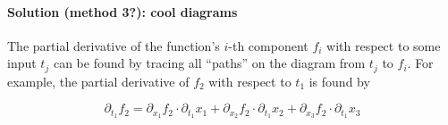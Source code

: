 \documentclass[11pt]{article}
\begin{document}
\paragraph{Solution (method 3?): cool diagrams}

\begin{center}
    \begin{tikzpicture}
        
    \end{tikzpicture}
\end{center}

The partial derivative of the function's \(i\)-th component \(f_i\) with respect to some input \(t_j\) can be found by tracing all ``paths'' on the diagram from \(t_j\) to \(f_i\). For example, the partial derivative of \(f_2\) with respect to \(t_1\) is found by
\begin{center}
\end{center}
\[
    \partial_{t_1} f_2 = \partial_{x_1} f_2 \cdot \partial_{t_1} x_1 +
                         \partial_{x_2} f_2 \cdot \partial_{t_1} x_2 +
                         \partial_{x_3} f_2 \cdot \partial_{t_1} x_3
\]
\end{document}

